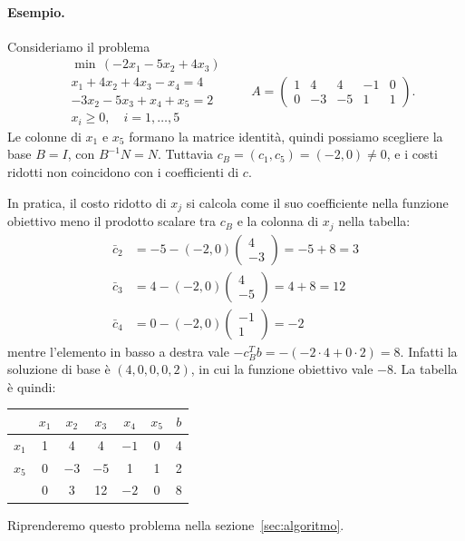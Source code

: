\paragraph{Esempio.}
Consideriamo il problema
\[
\begin{aligned}
&\min\, (-2x_1 - 5x_2 + 4x_3) \\
&x_1 + 4x_2 + 4x_3 - x_4 = 4 \\
&-3x_2 - 5x_3 + x_4 + x_5 = 2 \\
&x_i \ge 0, \quad i = 1, \dots, 5
\end{aligned}
\qquad
A = \begin{pmatrix} 1 & 4 & 4 & -1 & 0 \\ 0 & -3 & -5 & 1 & 1 \end{pmatrix}.
\]
Le colonne di $x_1$ e $x_5$ formano la matrice identità, quindi possiamo scegliere la base $B = I$, con $B^{-1}N = N$. Tuttavia $c_B = (c_1, c_5) = (-2, 0) \neq 0$, e i costi ridotti non coincidono con i coefficienti di $c$.

In pratica, il costo ridotto di $x_j$ si calcola come il suo coefficiente nella funzione obiettivo meno il prodotto scalare tra $c_B$ e la colonna di $x_j$ nella tabella:
\[
\begin{aligned}
\bar{c}_2 &= -5 - (-2, 0) \begin{pmatrix} 4 \\ -3 \end{pmatrix} = -5 + 8 = 3 \\
\bar{c}_3 &= 4 - (-2, 0) \begin{pmatrix} 4 \\ -5 \end{pmatrix} = 4 + 8 = 12 \\
\bar{c}_4 &= 0 - (-2, 0) \begin{pmatrix} -1 \\ 1 \end{pmatrix} = -2
\end{aligned}
\]
mentre l'elemento in basso a destra vale $-c_B^T b = -(-2 \cdot 4 + 0 \cdot 2) = 8$. Infatti la soluzione di base è $(4, 0, 0, 0, 2)$, in cui la funzione obiettivo vale $-8$. La tabella è quindi:
\begin{center}
\begin{tabular}{c|ccccc|c}
 & $x_1$ & $x_2$ & $x_3$ & $x_4$ & $x_5$ & $b$ \\
\hline
$x_1$ & 1 & 4 & 4 & $-1$ & 0 & 4 \\
$x_5$ & 0 & $-3$ & $-5$ & 1 & 1 & 2 \\
\hline
 & 0 & 3 & 12 & $-2$ & 0 & 8 \\
\end{tabular}
\end{center}
Riprenderemo questo problema nella sezione~\ref{sec:algoritmo}.

